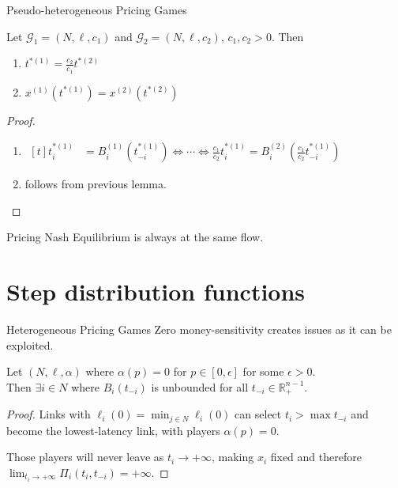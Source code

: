 \documentclass{beamer}
\newcommand{\R}{\mathbb{R}}
\newcommand{\Gm}{\mathcal{G}}
\begin{document}
\begin{frame}{Pseudo-heterogeneous Pricing Games}
	\begin{lemma}
		Let $\Gm_1 = (N, \ell, c_1)$ and $\Gm_2 = (N, \ell, c_2)$, $c_1, c_2 > 0$.
		Then
		\begin{enumerate}[$(i)$]
			\item $t^{*(1)} = \frac{c_2}{c_1} t^{*(2)}$
			\item $x^{(1)}(t^{*(1)}) = x^{(2)}(t^{*(2)})$
		\end{enumerate}
	\end{lemma}
	\begin{proof}
		\begin{enumerate}[$(i)$]
			\item
			$\begin{aligned}[t]
				t_i^{*(1)} &= B_i^{(1)}(t_{-i}^{*(1)}) \Leftrightarrow \cdots \Leftrightarrow \frac{c_1}{c_2} t_i^{*(1)} = B_i^{(2)}\left(\frac{c_1}{c_2} t_{-i}^{*(1)}\right)
			\end{aligned}$
			\item follows from previous lemma.
			\vspace{-20pt}
		\end{enumerate}
	\end{proof}
	Pricing Nash Equilibrium is always at the same flow.
\end{frame}

\section{Step distribution functions}

\begin{frame}{Heterogeneous Pricing Games}
	Zero money-sensitivity creates issues as it can be exploited.
	\begin{lemma}
		Let $(N, \ell, \alpha)$ where $\alpha(p) = 0$ for $p \in [0, \epsilon]$ for some $\epsilon > 0$.\\
		Then $\exists i \in N$ where $B_i(t_{-i})$ is unbounded for all $t_{-i} \in \R_+^{n - 1}$.
	\end{lemma}
	\begin{proof}
		Links with $\ell_i(0) = \min_{j \in N} \ell_i(0)$ can select $t_i > \max t_{-i}$ and become the lowest-latency link, with players $\alpha(p) = 0$.

		Those players will never leave as $t_i \rightarrow +\infty$, making $x_i$ fixed and therefore $\lim_{t_i \rightarrow +\infty} \Pi_i(t_i, t_{-i}) = +\infty$.
	\end{proof}
\end{frame}
\end{document}
